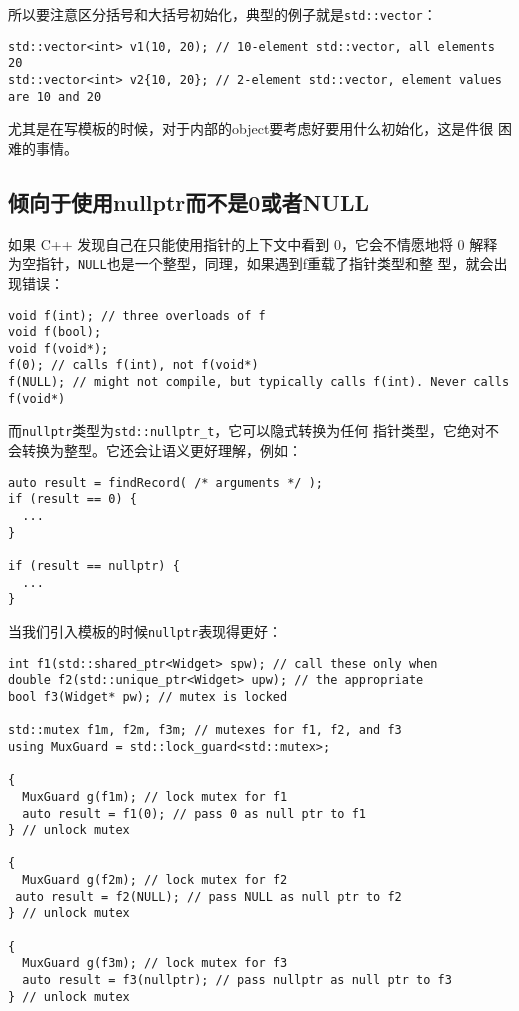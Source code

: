 所以要注意区分括号和大括号初始化，典型的例子就是\texttt{std::vector}：
\begin{verbatim}
std::vector<int> v1(10, 20); // 10-element std::vector, all elements 20
std::vector<int> v2{10, 20}; // 2-element std::vector, element values are 10 and 20
\end{verbatim}
尤其是在写模板的时候，对于内部的object要考虑好要用什么初始化，这是件很
困难的事情。

\subsection{倾向于使用nullptr而不是0或者NULL}
\label{sec:Item2-8}

如果 C++ 发现自己在只能使用指针的上下文中看到 0，它会不情愿地将 0 解释
为空指针，\texttt{NULL}也是一个整型，同理，如果遇到f重载了指针类型和整
型，就会出现错误：
\begin{verbatim}
void f(int); // three overloads of f
void f(bool);
void f(void*);
f(0); // calls f(int), not f(void*)
f(NULL); // might not compile, but typically calls f(int). Never calls f(void*)
\end{verbatim}

而\texttt{nullptr}类型为\texttt{std::nullptr\_t}，它可以隐式转换为任何
指针类型，它绝对不会转换为整型。它还会让语义更好理解，例如：
\begin{verbatim}
auto result = findRecord( /* arguments */ );
if (result == 0) {
  ...
}

if (result == nullptr) {
  ...
}
\end{verbatim}

当我们引入模板的时候\texttt{nullptr}表现得更好：
\begin{verbatim}
int f1(std::shared_ptr<Widget> spw); // call these only when
double f2(std::unique_ptr<Widget> upw); // the appropriate
bool f3(Widget* pw); // mutex is locked

std::mutex f1m, f2m, f3m; // mutexes for f1, f2, and f3
using MuxGuard = std::lock_guard<std::mutex>;

{
  MuxGuard g(f1m); // lock mutex for f1
  auto result = f1(0); // pass 0 as null ptr to f1
} // unlock mutex

{
  MuxGuard g(f2m); // lock mutex for f2
 auto result = f2(NULL); // pass NULL as null ptr to f2
} // unlock mutex

{
  MuxGuard g(f3m); // lock mutex for f3
  auto result = f3(nullptr); // pass nullptr as null ptr to f3
} // unlock mutex
\end{verbatim}

